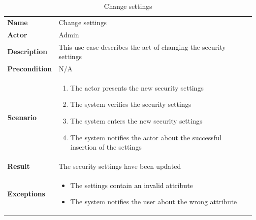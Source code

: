 \begin{table}[ht]
    \caption{Change settings}
    \begin{tabular}{|L{5cm}|L{10cm}|}
        \toprule
        \textbf{Name}         & Change settings                                                   \\
        \textbf{Actor}        & Admin                                                             \\
        \textbf{Description}  & This use case describes the act of changing the security settings \\
        \textbf{Precondition} & N/A                                                               \\
        \textbf{Scenario} &
        \vspace{-0.75cm}
        \begin{enumerate}
            \setlength\itemsep{-0.5em}
            \item The actor presents the new security settings
            \item The system verifies the security settings
            \item The system enters the new security settings
            \item The system notifies the actor about the successful insertion of the settings
        \end{enumerate} \\[-0.5cm]
        \textbf{Result}       & The security settings have been updated                           \\
        \textbf{Exceptions} &
        \vspace{-0.75cm}
        \begin{itemize}
            \setlength\itemsep{-0.5em}
            \item The settings contain an invalid attribute
            \item The system notifies the user about the wrong attribute
        \end{itemize} \\
        \bottomrule
    \end{tabular}\label{tab:table25}
\end{table}

